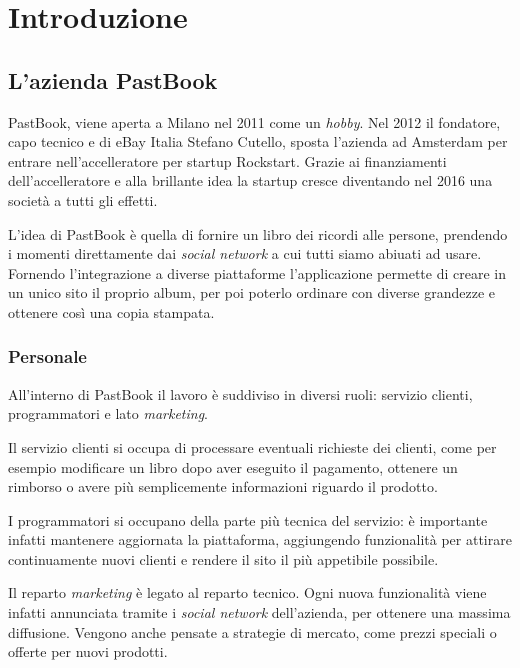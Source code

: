 \mainmatter

\chapter{Introduzione}

\section{L'azienda PastBook}

PastBook, viene aperta a Milano nel 2011 come un \textit{hobby}. Nel 2012 il
fondatore, capo tecnico e  di eBay Italia
Stefano Cutello, sposta l'azienda ad Amsterdam per entrare nell'accelleratore
per \gls{startup} Rockstart. Grazie ai finanziamenti dell'accelleratore e alla
brillante idea la \gls{startup} cresce diventando nel 2016 una società a tutti
gli effetti.

L'idea di PastBook è quella di fornire un libro dei ricordi alle
persone, prendendo i momenti direttamente dai \textit{social network} a cui
tutti siamo abiuati ad usare. Fornendo l'integrazione a diverse piattaforme
l'applicazione permette di creare in un unico sito il proprio album, per poi
poterlo ordinare con diverse grandezze e ottenere così una copia stampata.

\subsection{Personale}

All'interno di PastBook il lavoro è suddiviso in diversi ruoli: servizio
clienti, programmatori e lato \textit{marketing}.

Il servizio clienti si occupa di processare eventuali richieste dei clienti,
come per esempio modificare un libro dopo aver eseguito il pagamento, ottenere
un rimborso o avere più semplicemente informazioni riguardo il prodotto.

I programmatori si occupano della parte più tecnica del servizio: è importante
infatti mantenere aggiornata la piattaforma, aggiungendo funzionalità
per attirare continuamente nuovi clienti e rendere il sito il più appetibile
possibile.

Il reparto \textit{marketing} è legato al reparto tecnico. Ogni nuova
funzionalità viene infatti annunciata tramite i \textit{social network}
dell'azienda, per ottenere una massima diffusione. Vengono anche pensate a
strategie di mercato, come prezzi speciali o offerte per nuovi prodotti.

